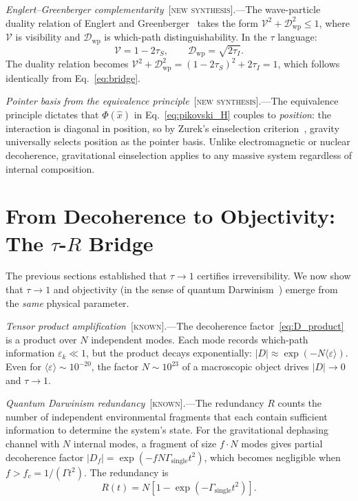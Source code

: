 \documentclass[prl,twocolumn,superscriptaddress,longbibliography,floatfix]{revtex4-2}
\newcommand{\tauasym}{\tau}
\begin{document}
\emph{Englert--Greenberger complementarity}~[\textsc{new
synthesis}].---The wave-particle duality relation of Englert and
Greenberger~\cite{Englert1996,Greenberger1988} takes the form
$\mathcal{V}^2 + \mathcal{D}_{\mathrm{wp}}^2 \leq 1$, where
$\mathcal{V}$ is visibility and $\mathcal{D}_{\mathrm{wp}}$ is
which-path distinguishability.  In the $\tauasym$ language:
\begin{equation}
\mathcal{V} = 1 - 2\tauasym_S, \qquad
\mathcal{D}_{\mathrm{wp}} = \sqrt{2\tauasym_I}.
\label{eq:EG_tau}
\end{equation}
The duality relation becomes
$\mathcal{V}^2 + \mathcal{D}_{\mathrm{wp}}^2
= (1 - 2\tauasym_S)^2 + 2\tauasym_I = 1$, which follows identically
from Eq.~\eqref{eq:bridge}.

\emph{Pointer basis from the equivalence principle}~[\textsc{new
synthesis}].---The equivalence principle dictates that
$\Phi(\hat{x})$ in Eq.~\eqref{eq:pikovski_H} couples to
\emph{position}: the interaction is diagonal in position,
so by Zurek's einselection criterion~\cite{Zurek2003},
gravity universally selects position as the pointer basis.
Unlike electromagnetic or nuclear decoherence, gravitational
einselection applies to any massive system regardless of
internal composition.

\section{From Decoherence to Objectivity: The $\tauasym$-$R$ Bridge}
\label{sec:tau_R}

The previous sections established that $\tauasym \to 1$ certifies
irreversibility.  We now show that $\tauasym \to 1$ and objectivity
(in the sense of quantum Darwinism~\cite{Zurek2009}) emerge from the
\emph{same} physical parameter.

\emph{Tensor product amplification}~[\textsc{known}].---The
decoherence factor~\eqref{eq:D_product} is a product over $N$
independent modes.  Each mode records which-path information
$\varepsilon_k \ll 1$, but the product decays exponentially:
$|D| \approx \exp(-N\langle\varepsilon\rangle)$.  Even for
$\langle\varepsilon\rangle \sim 10^{-20}$, the factor $N \sim
10^{23}$ of a macroscopic object drives
$|D| \to 0$ and $\tauasym \to 1$.

\emph{Quantum Darwinism redundancy}~[\textsc{known}].---The redundancy
$R$ counts the number of independent environmental fragments that each
contain sufficient information to determine the system's state.  For
the gravitational dephasing channel with $N$ internal modes,
a fragment of size $f\cdot N$ modes gives partial
decoherence factor $|D_f| = \exp(-fN\Gamma_{\mathrm{single}}t^2)$,
which becomes negligible when
$f > f_c = 1/(\Gamma t^2)$.  The redundancy
is~\cite{Zurek2009,Riedel2017}
\begin{equation}
R(t) = N\!\left[1 - \exp(-\Gamma_{\mathrm{single}}
  t^2)\right].
\label{eq:R_darwin}
\end{equation}
\end{document}
